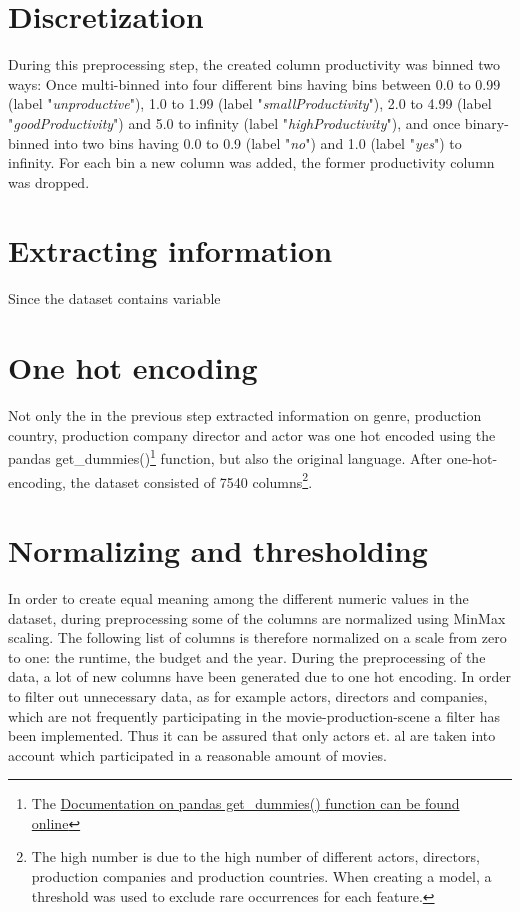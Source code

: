 \section{Discretization}
During this preprocessing step, the created column productivity was binned two ways: Once multi-binned into four different bins having bins between 0.0 to 0.99 (label "\textit{unproductive}"), 1.0 to 1.99 (label "\textit{smallProductivity}"), 2.0 to 4.99 (label "\textit{goodProductivity}") and 5.0 to infinity (label "\textit{highProductivity}"), and once binary-binned into two bins having 0.0 to 0.9 (label "\textit{no}") and 1.0 (label "\textit{yes}") to infinity. For each bin a new column was added, the former productivity column was dropped.

\section{Extracting information}
Since the dataset contains variable 

\section{One hot encoding}
Not only the in the previous step extracted information on genre, production country, production company director and actor was one hot encoded using the pandas get\_dummies()\footnote{The \hyperref{https://pandas.pydata.org/pandas-docs/stable/generated/pandas.get_dummies.html}{documentation}{pd.getDumies}{Documentation on pandas get\_dummies() function can be found online}} function, but also the original language. After one-hot-encoding, the dataset consisted of 7540 columns\footnote{The high number is due to the high number of different actors, directors, production companies and production countries. When creating a model, a threshold was used to exclude rare occurrences for each feature.}.

\section{Normalizing and thresholding}
In order to create equal meaning among the different numeric values in the dataset, during preprocessing some of the columns are normalized using MinMax scaling. The following list of columns is therefore normalized on a scale from zero to one: the runtime, the budget and the year.
During the preprocessing of the data, a lot of new columns have been generated due to one hot encoding. In order to filter out unnecessary data, as for example actors, directors and companies, which are not frequently participating in the movie-production-scene a filter has been implemented. Thus it can be assured that only actors et. al are taken into account which participated in a reasonable amount of movies.

